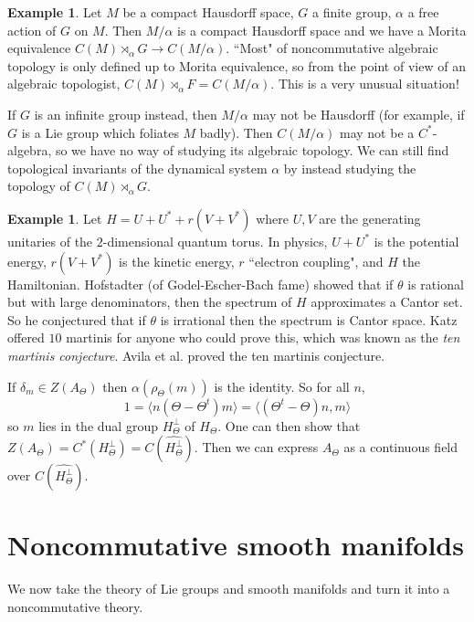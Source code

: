\documentclass[12pt]{report}
\newcommand{\dfn}[1]{\emph{#1}\index{#1}}
\theoremstyle{definition}
\newtheorem{example}[theorem]{Example}
\begin{document}
\begin{example}
    Let $M$ be a compact Hausdorff space, $G$ a finite group, $\alpha$ a free action of $G$ on $M$. Then $M/\alpha$ is a compact Hausdorff space and we have a Morita equivalence $C(M) \rtimes_\alpha G \to C(M/\alpha)$. ``Most" of noncommutative algebraic topology is only defined up to Morita equivalence, so from the point of view of an algebraic topologist, $C(M) \rtimes_\alpha F = C(M/\alpha)$. This is a very unusual situation!

    If $G$ is an infinite group instead, then $M/\alpha$ may not be Hausdorff (for example, if $G$ is a Lie group which foliates $M$ badly). Then $C(M/\alpha)$ may not be a $C^*$-algebra, so we have no way of studying its algebraic topology. We can still find topological invariants of the dynamical system $\alpha$ by instead studying the topology of $C(M) \rtimes_\alpha G$.
\end{example}

\begin{example}
    Let $H = U + U^* + r(V + V^*)$ where $U,V$ are the generating unitaries of the $2$-dimensional quantum torus. In physics, $U + U^*$ is the potential energy, $r(V + V^*)$ is the kinetic energy, $r$ ``electron coupling", and $H$ the Hamiltonian. Hofstadter (of Godel-Escher-Bach fame) showed that if $\theta$ is rational but with large denominators, then the spectrum of $H$ approximates a Cantor set. So he conjectured that if $\theta$ is irrational then the spectrum is Cantor space. Katz offered $10$ martinis for anyone who could prove this, which was known as the \dfn{ten martinis conjecture}. Avila et al. proved the ten martinis conjecture.
\end{example}

If $\delta_m \in Z(A_\Theta)$ then $\alpha(\rho_\Theta(m))$ is the identity. So for all $n$,
$$1 = \langle n (\Theta - \Theta^t)m \rangle = \langle(\Theta^t - \Theta)n, m\rangle$$
so $m$ lies in the dual group $H_\Theta^\perp$ of $H_\Theta$. One can then show that $Z(A_\Theta) = C^*(H_\Theta^\perp) = C(\widehat{H_\Theta^\perp})$. Then we can express $A_\Theta$ as a continuous field over $C(\widehat{H_\Theta^\perp})$.

\section{Noncommutative smooth manifolds}
We now take the theory of Lie groups and smooth manifolds and turn it into a noncommutative theory.
\end{document}
